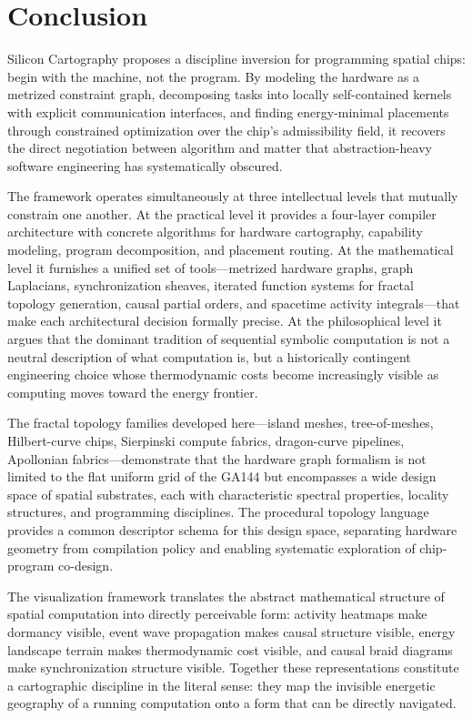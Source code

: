 \documentclass[11pt, a4paper]{article}
\begin{document}
\section{Conclusion}

Silicon Cartography proposes a discipline inversion for programming spatial chips:
begin with the machine, not the program. By modeling the hardware as a metrized
constraint graph, decomposing tasks into locally self-contained kernels with
explicit communication interfaces, and finding energy-minimal placements through
constrained optimization over the chip's admissibility field, it recovers the
direct negotiation between algorithm and matter that abstraction-heavy software
engineering has systematically obscured.

The framework operates simultaneously at three intellectual levels that mutually
constrain one another. At the practical level it provides a four-layer compiler
architecture with concrete algorithms for hardware cartography, capability modeling,
program decomposition, and placement routing. At the mathematical level it furnishes
a unified set of tools---metrized hardware graphs, graph Laplacians, synchronization
sheaves, iterated function systems for fractal topology generation, causal partial
orders, and spacetime activity integrals---that make each architectural decision
formally precise. At the philosophical level it argues that the dominant tradition
of sequential symbolic computation is not a neutral description of what computation
is, but a historically contingent engineering choice whose thermodynamic costs
become increasingly visible as computing moves toward the energy frontier.

The fractal topology families developed here---island meshes, tree-of-meshes,
Hilbert-curve chips, Sierpinski compute fabrics, dragon-curve pipelines, Apollonian
fabrics---demonstrate that the hardware graph formalism is not limited to the
flat uniform grid of the GA144 but encompasses a wide design space of spatial
substrates, each with characteristic spectral properties, locality structures,
and programming disciplines. The procedural topology language provides a common
descriptor schema for this design space, separating hardware geometry from
compilation policy and enabling systematic exploration of chip-program co-design.

The visualization framework translates the abstract mathematical structure of
spatial computation into directly perceivable form: activity heatmaps make
dormancy visible, event wave propagation makes causal structure visible, energy
landscape terrain makes thermodynamic cost visible, and causal braid diagrams
make synchronization structure visible. Together these representations constitute
a cartographic discipline in the literal sense: they map the invisible energetic
geography of a running computation onto a form that can be directly navigated.
\end{document}
